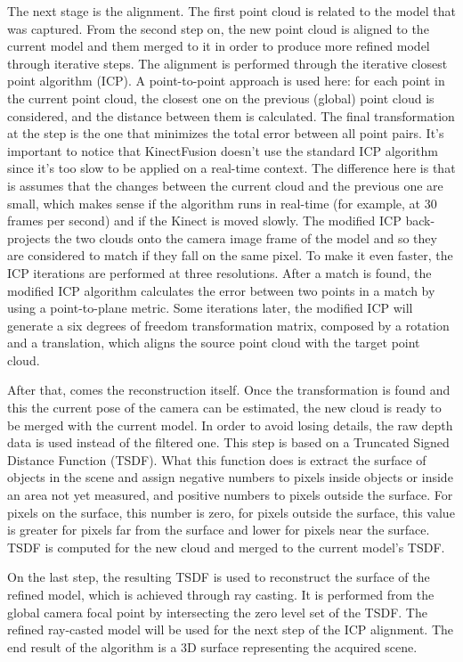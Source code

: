 \documentclass[msc, a4paper, classic, en]{ufbathesis}
\begin{document}
The next stage is the alignment. The first point cloud is related to the model that was captured. From the second step on, the new point cloud is aligned to the current model and them merged to it in order to produce more refined model through iterative steps. The alignment is performed through the iterative closest point algorithm (ICP). A point-to-point approach is used here: for each point in the current point cloud, the closest one on the previous (global) point cloud is considered, and the distance between them is calculated. The final transformation at the step is the one that minimizes the total error between all point pairs. It's important to notice that KinectFusion doesn't use the standard ICP algorithm since it's too slow to be applied on a real-time context. The difference here is that is assumes that the changes between the current cloud and the previous one are small, which makes sense if the algorithm runs in real-time (for example, at 30 frames per second) and if the Kinect is moved slowly. The modified ICP back-projects the two clouds onto the camera image frame of the model and so they are considered to match if they fall on the same pixel. To make it even faster, the ICP iterations are performed at three resolutions. After a match is found, the modified ICP algorithm calculates the error between two points in a match by using a point-to-plane metric. Some iterations later, the modified ICP will generate a six degrees of freedom transformation matrix, composed by a rotation and a translation, which aligns the source point cloud with the target point cloud.

After that, comes the reconstruction itself. Once the transformation is found and this the current pose of the camera can be estimated, the new cloud is ready to be merged with the current model. In order to avoid losing details, the raw depth data is used instead of the filtered one. This step is based on a Truncated Signed Distance Function (TSDF). What this function does is extract the surface of objects in the scene and assign negative numbers to pixels inside objects or inside an area not yet measured, and positive numbers to pixels outside the surface. For pixels on the surface, this number is zero, for pixels outside the surface, this value is greater for pixels far from the surface and lower for pixels near the surface. TSDF is computed for the new cloud and merged to the current model's TSDF.

On the last step, the resulting TSDF is used to reconstruct the surface of the refined model, which is achieved through ray casting. It is performed from the global camera focal point by intersecting the zero level set of the TSDF. The refined ray-casted model will be used for the next step of the ICP alignment. The end result of the algorithm is a 3D surface representing the acquired scene.
\end{document}
